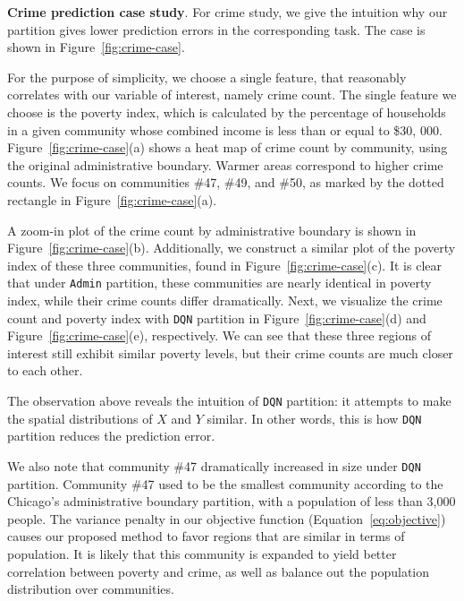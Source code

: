 \smallskip
\textbf{Crime prediction case study}. For crime study, we give the intuition why our partition gives lower prediction errors in the corresponding task. The case is shown in Figure~\ref{fig:crime-case}.

For the purpose of simplicity, we choose a single feature, that reasonably correlates with our variable of interest, namely crime count. The single feature we choose is the poverty index, which is calculated by the percentage of households in a given community whose combined income is less than or equal to \$30, 000. Figure~\ref{fig:crime-case}(a) shows a heat map of crime count by community, using the original administrative boundary. Warmer areas correspond to higher crime counts. We focus on communities \#47, \#49, and \#50, as marked by the dotted rectangle in Figure~\ref{fig:crime-case}(a). 


A zoom-in plot of the crime count by administrative boundary is shown in Figure~\ref{fig:crime-case}(b). Additionally, we construct a similar plot of the poverty index of these three communities, found in Figure~\ref{fig:crime-case}(c). It is clear that under  \texttt{Admin} partition, these communities are nearly identical in poverty index, while their crime counts differ dramatically. Next, we visualize the crime count and poverty index with  \texttt{DQN} partition in Figure~\ref{fig:crime-case}(d) and Figure~\ref{fig:crime-case}(e), respectively. We can see that these three regions of interest still exhibit similar poverty levels, but their crime counts are much closer to each other.


The observation above reveals the intuition of  \texttt{DQN} partition: it attempts to make the spatial distributions of $X$ and $Y$ similar. In other words, this is how  \texttt{DQN} partition reduces the prediction error.

We also note that community \#47 dramatically increased in size under  \texttt{DQN} partition. Community \#47 used to be the smallest community according to the Chicago’s administrative boundary partition, with a population of less than 3,000 people. The variance penalty in our objective function (Equation~\ref{eq:objective}) causes our proposed method to favor regions that are similar in terms of population. It is likely that this community is expanded to yield better correlation between poverty and crime, as well as balance out the population distribution over communities.




